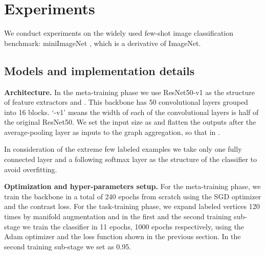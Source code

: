\documentclass[conference]{IEEEtran}
\begin{document}
\section{Experiments}\label{Section 4}

We conduct experiments on the widely used few-shot image classification benchmark: miniImageNet \cite{vinyals2016matching}, which is a derivative of ImageNet. 
\subsection{Models and implementation details}
\textbf{Architecture.} In the meta-training phase we use ResNet50-v1\cite{he2016deep} as the structure of feature extractors  and . This backbone has 50 convolutional layers grouped into 16 blocks. ‘-v1’ means the width of each of the convolutional layers is half of the original ResNet50. We set the input size as  and flatten the outputs after the average-pooling layer as inputs to the graph aggregation, so that  in .


In consideration of the extreme few labeled examples we take only one fully connected layer and a following softmax layer as the structure of the classifier  to avoid overfitting.

\textbf{Optimization and hyper-parameters setup.} For the meta-training phase, we train the backbone in a total of 240 epochs from scratch using the SGD optimizer \cite{bottou2010large} and the contrast loss. For the task-training phase, we expand labeled vertices 120 times by manifold augmentation and in the first and the second training sub-stage we train the classifier in 11 epochs, 1000 epochs respectively, using the Adam optimizer \cite{kingma2014adam} and the loss function shown in the previous section. In the second training sub-stage we set  as 0.95. 
\end{document}
